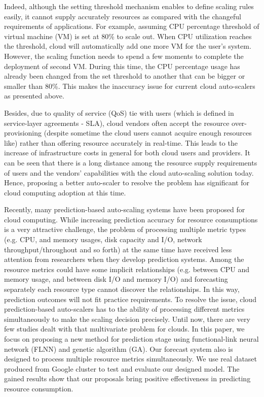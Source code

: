 \documentclass[conference]{IEEEtran}
\begin{document}
Indeed, although the setting threshold mechanism enables to define scaling rules easily, it cannot supply accurately resources as compared with the changeful requirements of applications. For example, assuming CPU percentage threshold of virtual machine (VM) is set at 80\% to scale out. When CPU utilization reaches the threshold, cloud will automatically add one more VM for the user’s system. However, the scaling function needs to spend a few moments to complete the deployment of second VM. During this time, the CPU percentage usage has already been changed from the set threshold to another that can be bigger or smaller than 80\%. This makes the inaccuracy issue for current cloud auto-scalers as presented above.

Besides, due to quality of service (QoS) tie with users (which is defined in service-layer agreements - SLA), cloud vendors often accept the resource over-provisioning (despite sometime the cloud users cannot acquire enough resources like) rather than offering resource accurately in real-time. This leads to the increase of infrastructure costs in general for both cloud users and providers. It can be seen that there is a long distance among the resource supply requirements of users and the vendors' capabilities with the cloud auto-scaling solution today. Hence, proposing a better auto-scaler to resolve the problem has significant for cloud computing adoption at this time.  

Recently, many prediction-based auto-scaling systems have been proposed for cloud computing. While increasing prediction accuracy for resource consumptions is a very attractive challenge, the problem of processing multiple metric types (e.g. CPU, and memory usages, disk capacity and I/O, network throughput/throughout and so forth) at the same time have received less attention from researchers when they develop prediction systems. Among the resource metrics could have some implicit relationships (e.g. between CPU and memory usage, and between disk I/O and memory I/O) and forecasting separately each resource type cannot discover the relationships. In this way, prediction outcomes will not fit practice requirements. To resolve the issue, cloud prediction-based auto-scalers has to the ability of processing different metrics simultaneously to make the scaling decision precisely. Until now, there are very few studies dealt with that multivariate problem for clouds. In this paper, we focus on proposing a new method for prediction stage using functional-link neural network (FLNN) and genetic algorithm (GA). Our forecast system also is designed to process multiple resource metrics simultaneously. We use real dataset produced from Google cluster to test and evaluate our designed model. The gained results show that our proposals bring positive effectiveness in predicting resource consumption.
\end{document}
